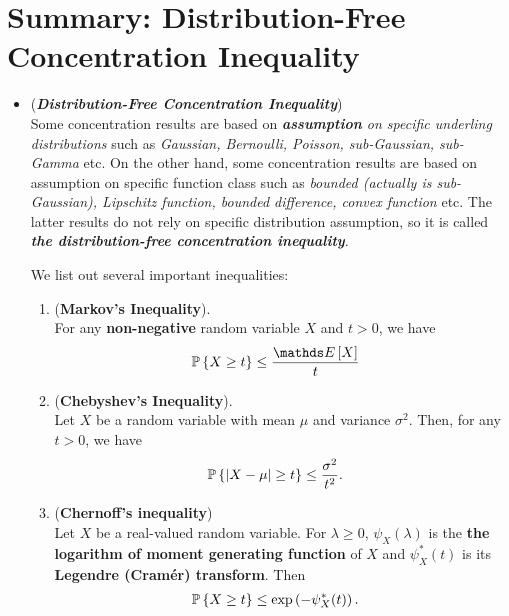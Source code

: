 \documentclass[11pt]{article}
\begin{document}
\section{Summary: Distribution-Free Concentration Inequality}
\begin{itemize}
\item \begin{remark} (\textbf{\emph{Distribution-Free Concentration Inequality}}) \\
Some concentration results are based on \emph{\textbf{assumption} on specific underling distributions} such as \emph{Gaussian, Bernoulli, Poisson, sub-Gaussian, sub-Gamma} etc. On the other hand, some concentration results are based on assumption on specific function class such as \emph{bounded (actually is sub-Gaussian), Lipschitz function, bounded difference, convex function} etc. The latter results do not rely on specific distribution assumption, so it is called \emph{\textbf{the distribution-free concentration inequality}}. 

We list out several important inequalities:
\begin{enumerate}
\item \begin{theorem} (\textbf{Markov's Inequality}). \citep{vershynin2018high}\\
For any \textbf{non-negative} random variable $X$ and $t > 0$, we have
\begin{align*}
\bP\set{X \ge t} &\le \frac{\E{}{X}}{t} 
\end{align*}
\end{theorem}

\item \begin{theorem} (\textbf{Chebyshev's Inequality}). \citep{vershynin2018high}\\
Let $X$ be a random variable with mean $\mu$ and variance $\sigma^2$. Then, for any $t > 0$, we have
\begin{align*}
{\mathbb P}\left\{\left\lvert X - \mu \right\rvert \ge t\right\} &\le \frac{\sigma^2}{t^2}. 
\end{align*}
\end{theorem}

\item \begin{theorem} (\textbf{Chernoff's inequality}) \citep{boucheron2013concentration}\\
Let $X$ be a real-valued random variable. For $\lambda \ge 0$,  $\psi_{X}(\lambda)$ is the \textbf{the logarithm of moment generating function} of $X$ and $\psi^{*}_{X}(t)$ is its \textbf{Legendre (Cram{\'e}r) transform}. Then 
\begin{align*}
{\mathbb P}\left\{X \ge t\right\} &\le \exp\left(-\psi^{*}_{X}(t)\right). 
\end{align*}
\end{theorem}


\end{enumerate}
\end{remark}
\end{itemize}
\end{document}
